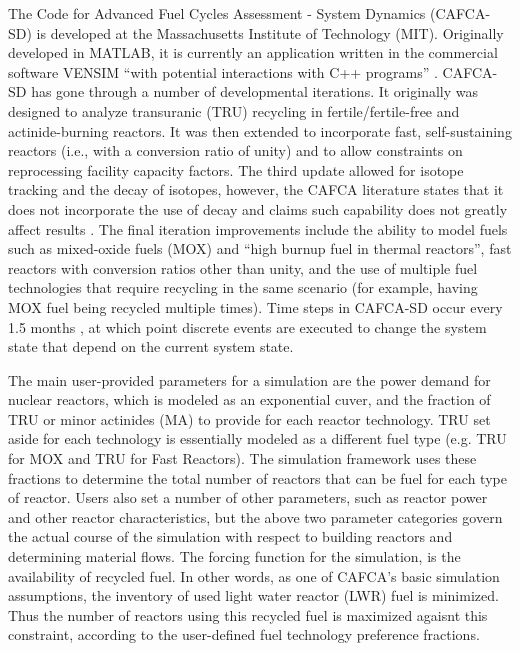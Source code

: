 The Code for Advanced Fuel Cycles Assessment - System Dynamics (CAFCA-SD) is
developed at the Massachusetts Institute of Technology (MIT). Originally
developed in MATLAB, it is currently an application written in the commercial
software VENSIM \cite{vensim_2010_ventana} ``with potential interactions with
C++ programs'' \cite{guerin_benchmark_2009}. CAFCA-SD has gone through a number
of developmental iterations. It originally was designed to analyze transuranic
(TRU) recycling in fertile/fertile-free and actinide-burning reactors. It was
then extended to incorporate fast, self-sustaining reactors (i.e., with a
conversion ratio of unity) and to allow constraints on reprocessing facility
capacity factors. The third update allowed for isotope tracking and the decay of
isotopes, however, the CAFCA literature states that it does not incorporate the
use of decay and claims such capability does not greatly affect results
\cite{guerin_impact_2009,guerin_benchmark_2009}. The final iteration
improvements include the ability to model fuels such as mixed-oxide fuels (MOX)
and ``high burnup fuel in thermal reactors'', fast reactors with conversion
ratios other than unity, and the use of multiple fuel technologies that require
recycling in the same scenario (for example, having MOX fuel being recycled
multiple times). Time steps in CAFCA-SD occur every 1.5
months \cite{guerin_impact_2009}, at which point discrete events are executed to
change the system state that depend on the current system state.

The main user-provided parameters for a simulation are the power demand for
nuclear reactors, which is modeled as an exponential cuver, and the fraction of
TRU or minor actinides (MA) to provide for each reactor technology. TRU set
aside for each technology is essentially modeled as a different fuel type
(e.g. TRU for MOX and TRU for Fast Reactors). The simulation framework uses
these fractions to determine the total number of reactors that can be fuel for
each type of reactor. Users also set a number of other parameters, such as
reactor power and other reactor characteristics, but the above two parameter
categories govern the actual course of the simulation with respect to building
reactors and determining material flows. The forcing function for the
simulation, is the availability of recycled fuel. In other words, as one of
CAFCA's basic simulation assumptions, the inventory of used light water reactor
(LWR) fuel is minimized. Thus the number of reactors using this recycled fuel is
maximized agaisnt this constraint, according to the user-defined fuel technology
preference fractions. 

